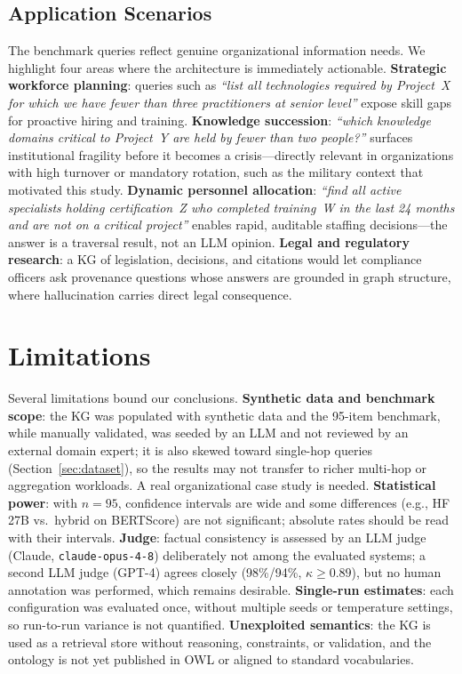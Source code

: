 \documentclass{ceurart}
\begin{document}
\subsection{Application Scenarios}

The benchmark queries reflect genuine organizational information needs. We
highlight four areas where the architecture is immediately actionable.
\textbf{Strategic workforce planning}: queries such as \textit{``list all
technologies required by Project~X for which we have fewer than three practitioners
at senior level''} expose skill gaps for proactive hiring and training.
\textbf{Knowledge succession}: \textit{``which knowledge domains critical to
Project~Y are held by fewer than two people?''} surfaces institutional fragility
before it becomes a crisis---directly relevant in organizations with high turnover
or mandatory rotation, such as the military context that motivated this study.
\textbf{Dynamic personnel allocation}: \textit{``find all active specialists
holding certification~Z who completed training~W in the last 24 months and are not
on a critical project''} enables rapid, auditable staffing decisions---the answer
is a traversal result, not an LLM opinion. \textbf{Legal and regulatory research}:
a KG of legislation, decisions, and citations would let compliance officers ask
provenance questions whose answers are grounded in graph structure, where
hallucination carries direct legal consequence.

\section{Limitations}
\label{sec:limitations}

Several limitations bound our conclusions. \textbf{Synthetic data and benchmark
scope}: the KG was populated with synthetic data and the 95-item benchmark, while
manually validated, was seeded by an LLM and not reviewed by an external domain
expert; it is also skewed toward single-hop queries (Section~\ref{sec:dataset}), so
the results may not transfer to richer multi-hop or aggregation workloads. A real
organizational case study is needed. \textbf{Statistical power}: with $n=95$,
confidence intervals are wide and some differences (e.g., HF\,27B vs.\ hybrid on
BERTScore) are not significant; absolute rates should be read with their intervals.
\textbf{Judge}: factual consistency is assessed by an LLM judge (Claude,
\texttt{claude-opus-4-8}) deliberately not among the evaluated systems; a second LLM
judge (GPT-4) agrees closely (98\%/94\%, $\kappa\geq0.89$), but no human annotation
was performed, which remains desirable. \textbf{Single-run estimates}: each configuration was evaluated
once, without multiple seeds or temperature settings, so run-to-run variance is not
quantified. \textbf{Unexploited semantics}: the KG is used as a retrieval store
without reasoning, constraints, or validation, and the ontology is not yet
published in OWL or aligned to standard vocabularies.
\end{document}
